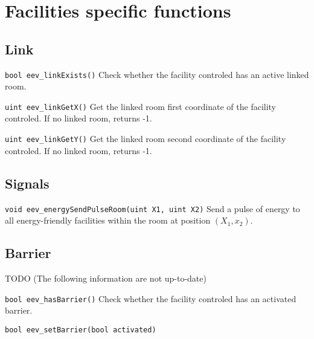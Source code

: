 \documentclass[10pt,a4paper]{scrartcl}
\newenvironment{apiCode}[1]
{ \begin{lrbox}{\mybox} \begin{minipage}{0.9\textwidth} {\texttt{#1}} \vspace{8pt} \newline }
{ \end{minipage} \end{lrbox}\fbox{\usebox{\mybox}} \newline\vspace{4pt}\newline }
\begin{document}
\newpage
\section{Facilities specific functions}
\subsection{Link}
\begin{apiCode}{bool eev_linkExists()}
Check whether the facility controled has an active linked room.
\end{apiCode}
\begin{apiCode}{uint eev_linkGetX()}
Get the linked room first coordinate of the facility controled.\newline
If no linked room, returns -1.
\end{apiCode}
\begin{apiCode}{uint eev_linkGetY()}
Get the linked room second coordinate of the facility controled.\newline
If no linked room, returns -1.
\end{apiCode}

\subsection{Signals}
\begin{apiCode}{void eev_energySendPulseRoom(uint X1, uint X2)}
Send a pulse of energy to all energy-friendly facilities within the room at position $(X_1, x_2)$.
\end{apiCode}

\subsection{Barrier}
TODO (The following information are not up-to-date)\newline
\begin{apiCode}{bool eev_hasBarrier()}
Check whether the facility controled has an activated barrier.
\end{apiCode}
\begin{apiCode}{bool eev_setBarrier(bool activated)}
\end{apiCode}
\end{document}
